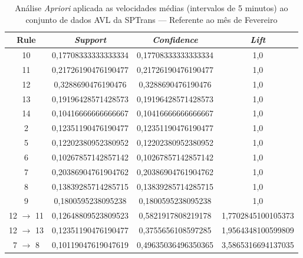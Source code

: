\documentclass[
	12pt,				%
	oneside,			%
	a4paper,			%
	english,			%
	brazil				%
	]{abntex2ppgsi}
\begin{document}
\begin{apendicesenv}
\begin{table}[!htb]
\centering
\caption {Análise \textit{Apriori} aplicada as velocidades médias (intervalos de 5 minutos) ao conjunto de dados AVL da SPTrans --- Referente ao mês de Fevereiro}
\label {tab:aprioriFebruary}
\begin{tabular}{c|c|c|c}
\hline
\textbf{Rule} & \textit{\textbf{Support}} & \textit{\textbf{Confidence}} & \textit{\textbf{Lift}} \\
\hline
10 &  0,17708333333333334 &  0,17708333333333334 &  1,0\\ \hline 11 &  0,21726190476190477 &  0,21726190476190477 &  1,0\\ \hline 12 &  0,3288690476190476 &  0,3288690476190476 &  1,0\\ \hline 13 &  0,19196428571428573 &  0,19196428571428573 &  1,0\\ \hline 14 &  0,10416666666666667 &  0,10416666666666667 &  1,0\\ \hline 2 &  0,12351190476190477 &  0,12351190476190477 &  1,0\\ \hline 5 &  0,12202380952380952 &  0,12202380952380952 &  1,0\\ \hline 6 &  0,10267857142857142 &  0,10267857142857142 &  1,0\\ \hline 7 &  0,20386904761904762 &  0,20386904761904762 &  1,0\\ \hline 8 &  0,13839285714285715 &  0,13839285714285715 &  1,0\\ \hline 9 &  0,1800595238095238 &  0,1800595238095238 &  1,0\\ \hline 12 $\rightarrow$ 11 &  0,12648809523809523 &  0,5821917808219178 &  1,7702845100105373\\ \hline 12 $\rightarrow$ 13 &  0,12351190476190477 &  0,3755656108597285 &  1,9564348100599809\\ \hline 7 $\rightarrow$ 8 &  0,10119047619047619 &  0,49635036496350365 &  3,5865316694137035\\
\hline
\end{tabular}
\end{table}


\end{apendicesenv}
\end{document}
